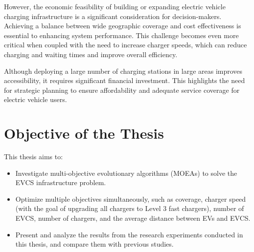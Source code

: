 However, the economic feasibility of building or expanding electric vehicle charging infrastructure is a significant consideration for decision-makers. Achieving a balance between wide geographic coverage and cost effectiveness is essential to enhancing system performance. This challenge becomes even more critical when coupled with the need to increase charger speeds, which can reduce charging and waiting times and improve overall efficiency.

Although deploying a large number of charging stations in large areas improves accessibility, it requires significant financial investment. This highlights the need for strategic planning to ensure affordability and adequate service coverage for electric vehicle users.

\section{Objective of the Thesis}
This thesis aims to:
    \begin{itemize}
    \item Investigate multi-objective evolutionary algorithms (MOEAs) to solve the EVCS infrastructure problem.
    \item Optimize multiple objectives simultaneously, such as coverage, charger speed (with the goal of upgrading all chargers to Level 3 fast chargers), number of EVCS, number of chargers, and the average distance between EVs and EVCS.
    \item Present and analyze the results from the research experiments conducted in this thesis, and compare them with previous studies.
    \end{itemize}